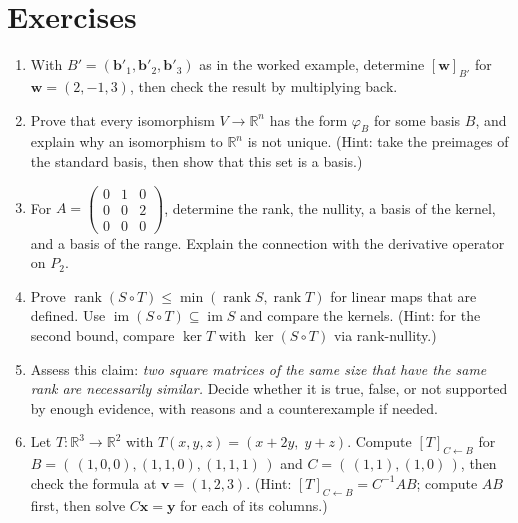 \section{Exercises}

\begin{latihan}
\begin{enumerate}
  \item With $B'=(\mathbf{b}'_{1},\mathbf{b}'_{2},\mathbf{b}'_{3})$ as in the worked
example, determine $[\mathbf{w}]_{B'}$ for $\mathbf{w}=(2,-1,3)$, then check the result
        by multiplying back.

\item Prove that every isomorphism $V\to\mathbb{R}^{n}$ has the form $\varphi_{B}$ for
        some basis $B$, and explain why an isomorphism to $\mathbb{R}^{n}$ is not unique.
        (Hint: take the preimages of the standard basis, then show that this set is a basis.)

  \item For $A=\begin{pmatrix}0&1&0\\ 0&0&2\\ 0&0&0\end{pmatrix}$, determine the rank, the nullity,
        a basis of the kernel, and a basis of the range. Explain the connection with the derivative operator on
        $P_{2}$.

\item Prove $\operatorname{rank}(S\circ T)\le\min(\operatorname{rank}S,\operatorname{rank}T)$
        for linear maps that are defined. Use
        $\operatorname{im}(S\circ T)\subseteq\operatorname{im}S$ and compare the kernels.
        (Hint: for the second bound, compare $\ker T$ with $\ker(S\circ T)$ via
        rank-nullity.)

\item Assess this claim: \emph{two square matrices of the same size that have the same rank
are necessarily similar.} Decide whether it is true, false, or not supported by enough evidence, with reasons and a counterexample if needed.

\item Let $T\colon\mathbb{R}^{3}\to\mathbb{R}^{2}$ with
        $T(x,y,z)=(x+2y,\;y+z)$. Compute $[T]_{C\leftarrow B}$ for
$B=(\,(1,0,0),(1,1,0),(1,1,1)\,)$ and $C=(\,(1,1),(1,0)\,)$, then check the formula at
        $\mathbf{v}=(1,2,3)$.
        (Hint: $[T]_{C\leftarrow B}=C^{-1}AB$; compute $AB$ first, then solve
        $C\mathbf{x}=\mathbf{y}$ for each of its columns.)


\end{enumerate}
\end{latihan}
